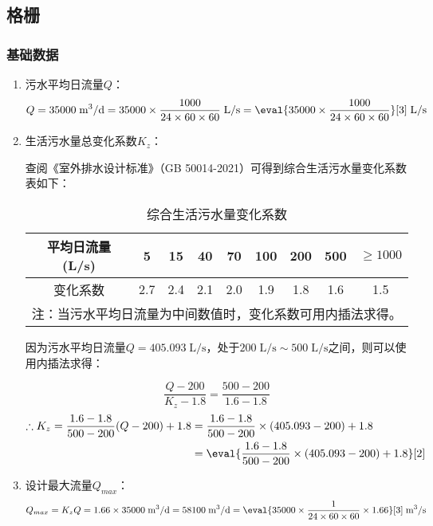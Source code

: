 \subsection{格栅}
\subsubsection{基础数据}
\begin{enumerate}
	\item 污水平均日流量$Q$：
	$$Q=35000\;\text{m$^3$/d}=35000\times\dfrac{1000}{24\times60\times60}\;\text{L/s}=\eval{35000\times\dfrac{1000}{24\times60\times60}}[3]\;\text{L/s}$$
	\item 生活污水量总变化系数$K_z$：
	
	查阅《室外排水设计标准》（GB 50014-2021）可得到综合生活污水量变化系数表如下：
	\begin{table}[H]
		\centering
		\caption{综合生活污水量变化系数\cite{GB500152019}}
		\begin{tabular}{ccccccccc}
		\toprule
		平均日流量(L/s) & 5     & 15    & 40    & 70    & 100   & 200   & 500   & $\geqslant 1000$ \\
		\midrule
		变化系数  & 2.7   & 2.4   & 2.1   & 2.0     & 1.9   & 1.8   & 1.6   & 1.5 \\
		\bottomrule
		\multicolumn{9}{l}{注：当污水平均日流量为中间数值时，变化系数可用内插法求得。} \\
		\end{tabular}
		\label{tab:Comprehensive domestic sewage volume change coefficient}
	\end{table}

	因为污水平均日流量$Q=405.093\;\text{L/s}$，处于$200\;\text{L/s}\sim 500\;\text{L/s}$之间，则可以使用内插法求得：

	\begin{equation}
		\dfrac{Q-200}{K_z-1.8}=\dfrac{500-200}{1.6-1.8}
	\end{equation}
	\begin{align*}
		\therefore K_z=\dfrac{1.6-1.8}{500-200}(Q-200)+1.8 &=\dfrac{1.6-1.8}{500-200}\times(405.093-200)+1.8 \\
		&=\eval{\dfrac{1.6-1.8}{500-200}\times(405.093-200)+1.8}[2]
	\end{align*}

	\item 设计最大流量$Q_{max}$：
	$$Q_{max}=K_zQ=\workKz\times 35000\;\text{m$^3$/d}=58100 \;\text{m$^3$/d}=\eval{35000\times\dfrac{1}{24\times60\times60}\times1.66}[3]\;\text{m$^3$/s}$$
\end{enumerate}

